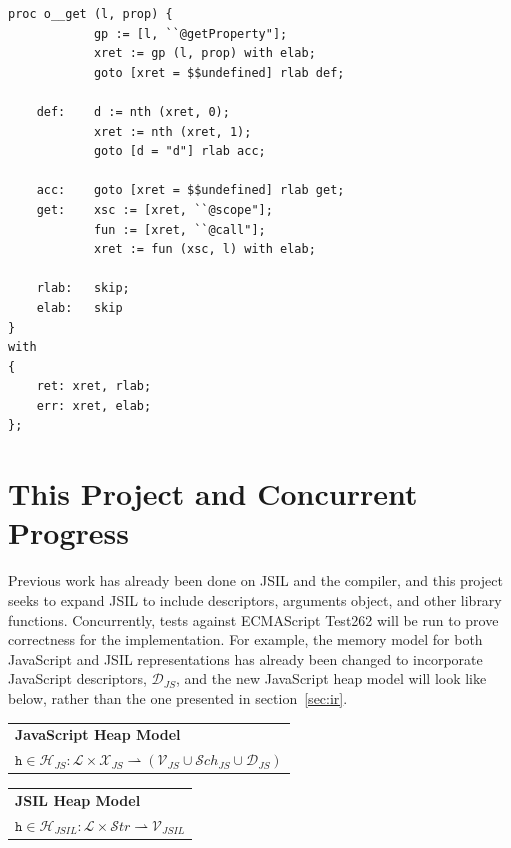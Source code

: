 \documentclass[a4paper,11pt,twoside]{report}
\begin{document}
\begin{center}
\begin{minipage}{9cm}
\begin{lstlisting}
proc o__get (l, prop) {
			gp := [l, ``@getProperty"];
			xret := gp (l, prop) with elab;	
			goto [xret = $$undefined] rlab def;
			
	def:	d := nth (xret, 0);
			xret := nth (xret, 1);
			goto [d = "d"] rlab acc;
			
	acc:	goto [xret = $$undefined] rlab get;
	get:	xsc := [xret, ``@scope"];
			fun := [xret, ``@call"];
			xret := fun (xsc, l) with elab;
			
	rlab:	skip;
	elab:	skip
}
with
{
    ret: xret, rlab;
    err: xret, elab;
};
\end{lstlisting}
\end{minipage}
\end{center}

\chapter{This Project and Concurrent Progress}
Previous work has already been done on JSIL and the compiler, and this project seeks to expand JSIL to include descriptors, arguments object, and other library functions. Concurrently, tests against ECMAScript Test262 will be run to prove correctness for the implementation. For example, the memory model for both JavaScript and JSIL representations has already been changed to incorporate JavaScript descriptors, $\mathcal{D}_{JS}$, and the new JavaScript heap model will look like below, rather than the one presented in section~\ref{sec:ir}.

\begin{center}
\begin{tabular}{p{9cm}} \hline
\textbf{JavaScript Heap Model} \\
$\texttt{h} \in \mathcal{H}_{JS} : \mathcal{L} \times \mathcal{X}_{JS} \rightharpoonup (\mathcal{V}_{JS} \cup \mathcal{S}ch_{JS} \cup \mathcal{D}_{JS})$  \\ \hline
\end{tabular}

\begin{tabular}{p{9cm}} \hline
\textbf{JSIL Heap Model} \\
$\texttt{h} \in \mathcal{H}_{JSIL} : \mathcal{L} \times \mathcal{S}tr \rightharpoonup \mathcal{V}_{JSIL}  $  \\ \hline
\end{tabular}
\end{center}
\end{document}
